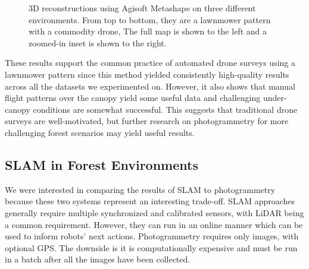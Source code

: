 \begin{figure}[H]
    \hfill
    \caption{3D reconstructions using Agisoft Metashape on three different environments. From top to bottom, they are a lawnmower pattern with a commodity drone,  The full map is shown to the left and a zoomed-in inset is shown to the right.}
    \label{fig:results:sfm}
\end{figure}

These results support the common practice of automated drone surveys using a lawnmower pattern since this method yielded consistently high-quality results across all the datasets we experimented on. However, it also shows that manual flight patterns over the canopy yield some useful data and challenging under-canopy conditions are somewhat successful. This suggests that traditional drone surveys are well-motivated, but further research on photogrammetry for more challenging forest scenarios may yield useful results.


\subsection{SLAM in Forest Environments}
We were interested in comparing the results of SLAM to photogrammetry because these two systems represent an interesting trade-off. SLAM approaches generally require multiple synchronized and calibrated sensors, with LiDAR being a common requirement. However, they can run in an online manner which can be used to inform robots' next actions. Photogrammetry requires only images, with optional GPS. The downside is it is computationally expensive and must be run in a batch after all the images have been collected.



